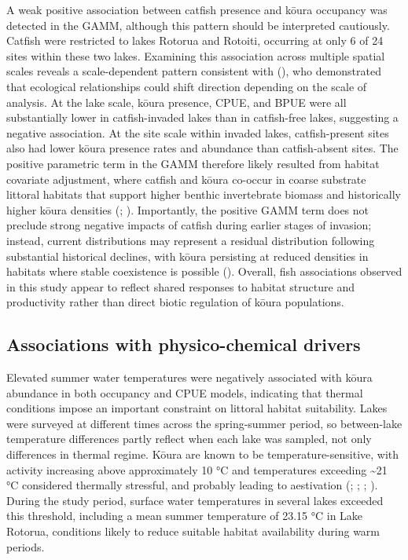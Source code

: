 \documentclass[
  letterpaper,
  DIV=11,
  numbers=noendperiod]{scrartcl}
\begin{document}
A weak positive association between catfish presence and kōura occupancy
was detected in the GAMM, although this pattern should be interpreted
cautiously. Catfish were restricted to lakes Rotorua and Rotoiti,
occurring at only 6 of 24 sites within these two lakes. Examining this
association across multiple spatial scales reveals a scale-dependent
pattern consistent with (), who
demonstrated that ecological relationships could shift direction
depending on the scale of analysis. At the lake scale, kōura presence,
CPUE, and BPUE were all substantially lower in catfish-invaded lakes
than in catfish-free lakes, suggesting a negative association. At the
site scale within invaded lakes, catfish-present sites also had lower
kōura presence rates and abundance than catfish-absent sites. The
positive parametric term in the GAMM therefore likely resulted from
habitat covariate adjustment, where catfish and kōura co-occur in coarse
substrate littoral habitats that support higher benthic invertebrate
biomass and historically higher kōura densities
(;
). Importantly, the
positive GAMM term does not preclude strong negative impacts of catfish
during earlier stages of invasion; instead, current distributions may
represent a residual distribution following substantial historical
declines, with kōura persisting at reduced densities in habitats where
stable coexistence is possible (). Overall, fish associations observed in this study appear to
reflect shared responses to habitat structure and productivity rather
than direct biotic regulation of kōura populations.

\subsection{Associations with physico-chemical
drivers}\label{associations-with-physico-chemical-drivers}

Elevated summer water temperatures were negatively associated with kōura
abundance in both occupancy and CPUE models, indicating that thermal
conditions impose an important constraint on littoral habitat
suitability. Lakes were surveyed at different times across the
spring-summer period, so between-lake temperature differences partly
reflect when each lake was sampled, not only differences in thermal
regime. Kōura are known to be temperature-sensitive, with activity
increasing above approximately 10 °C and temperatures exceeding
\textasciitilde21 °C considered thermally stressful, and probably
leading to aestivation (;
;
;
). During the study period,
surface water temperatures in several lakes exceeded this threshold,
including a mean summer temperature of 23.15 °C in Lake Rotorua,
conditions likely to reduce suitable habitat availability during warm
periods.
\end{document}
